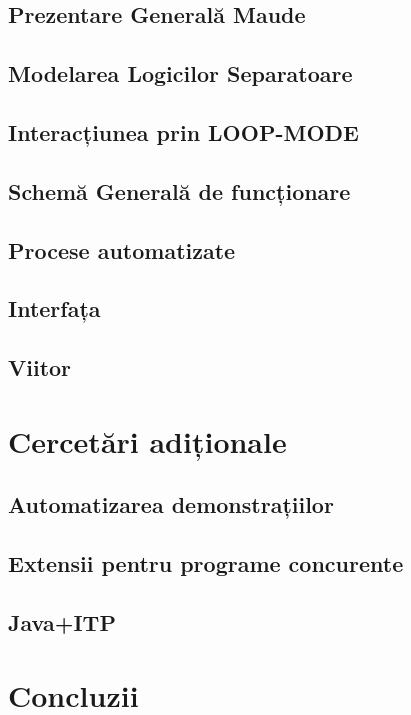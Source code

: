 \documentclass[12pt,a4paper]{article}
\begin{document}
\subsection{Prezentare Generală Maude}
\subsection{Modelarea Logicilor Separatoare}
\subsection{Interacțiunea prin LOOP-MODE}
\subsection{Schemă Generală de funcționare}
\subsection{Procese automatizate}
\subsection{Interfața}
\subsection{Viitor}
\section{Cercetări adiționale}
\subsection{Automatizarea demonstrațiilor}
\subsection{Extensii pentru programe concurente}
\subsection{Java+ITP}

\section{Concluzii}
\end{document}
